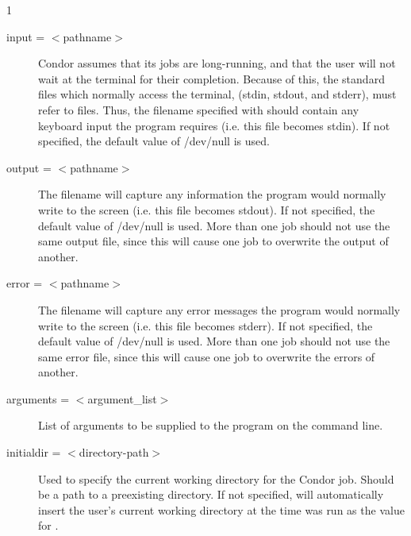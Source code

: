 \begin{ManPage}{\label{man-condor-submit}}{1}
\begin{description}

\item[input = $<$pathname$>$] Condor assumes that its jobs are
long-running, and that the user will not wait at the terminal for their
completion. Because of this, the standard files which normally access
the terminal, (stdin, stdout, and stderr), must refer to files. Thus,
the filename specified with  should contain any keyboard
input the program requires (i.e. this file becomes stdin). If not
specified, the default value of /dev/null is used. 


\item[output = $<$pathname$>$] The  filename will capture
any information the program would normally write to the screen (i.e.
this file becomes stdout). If not specified, the default value of
/dev/null is used. More than one job should not use the same output
file, since this will cause one job to overwrite the output of
another.


\item[error = $<$pathname$>$] The  filename will capture any
error messages the program would normally write to the screen (i.e. this
file becomes stderr). If not specified, the default value of /dev/null
is used. More than one job should not use the same error file, since
this will cause one job to overwrite the errors of another.


\item[arguments = $<$argument\_list$>$] List of arguments to be supplied
to the program on the command line. 



\item[initialdir = $<$directory-path$>$] Used to specify the current
working directory for the Condor job. Should be a path to a preexisting
directory. If not specified,  will automatically insert
the user's current working directory at the time  was run
as the value for . 




\end{description}
\end{ManPage}
